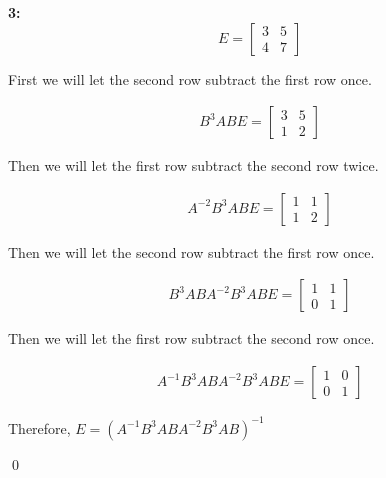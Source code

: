 \documentclass[11pt]{article}
\newenvironment{exercise}[1]
	{\noindent \textbf{#1:}}
	{\par \vspace{0.5\baselineskip}}
\begin{document}
\begin{exercise}{3}
	\[
	E=\begin{bmatrix}
		3 & 5 \\
		4 & 7
	\end{bmatrix}
	\]

	First we will let the second row subtract the first row once.

	\begin{align*}
		B^{3}ABE = \begin{bmatrix}
			3 & 5 \\
			1 & 2
		\end{bmatrix}
	\end{align*}

	Then we will let the first row subtract the second row twice.

	\begin{align*}
		A^{-2}B^{3}ABE = \begin{bmatrix}
			1 & 1 \\
			1 & 2
		\end{bmatrix}
	\end{align*}

	Then we will let the second row subtract the first row once.

	\begin{align*}
		B^{3}ABA^{-2}B^{3}ABE = \begin{bmatrix}
			1 & 1 \\
			0 & 1
		\end{bmatrix}
	\end{align*}

	Then we will let the first row subtract the second row once.

	\begin{align*}
		A^{-1}B^{3}ABA^{-2}B^{3}ABE = \begin{bmatrix}
			1 & 0 \\
			0 & 1
		\end{bmatrix}
	\end{align*}


	Therefore, \(E=(A^{-1}B^{3}ABA^{-2}B^{3}AB)^{-1}\)
\end{exercise}


\qed
\end{document}

